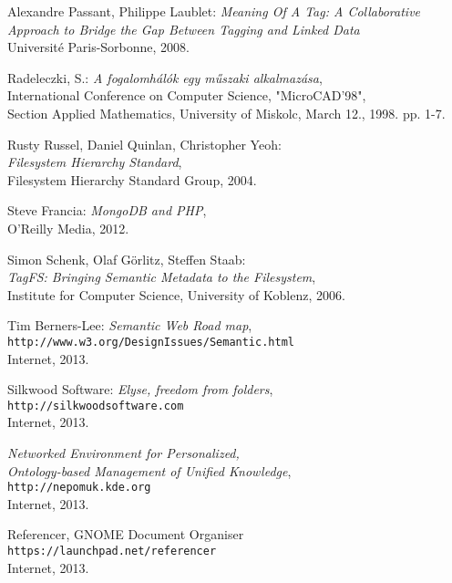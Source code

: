 \begin{thebibliography}{9}
Alexandre Passant, Philippe Laublet: \emph{Meaning Of A Tag: A Collaborative Approach to Bridge the Gap Between Tagging and Linked Data} \\
Université Paris-Sorbonne, 2008.

Radeleczki, S.: \emph{A fogalomhálók egy műszaki alkalmazása}, \\
International Conference on Computer Science, "MicroCAD'98", \\
Section Applied Mathematics, University of Miskolc, March 12., 1998. pp. 1-7.

Rusty Russel, Daniel Quinlan, Christopher Yeoh: \\
\emph{Filesystem Hierarchy Standard}, \\
Filesystem Hierarchy Standard Group, 2004.

Steve Francia: \emph{MongoDB and PHP}, \\
O'Reilly Media, 2012.

Simon Schenk, Olaf Görlitz, Steffen Staab: \\
\emph{TagFS: Bringing Semantic Metadata to the Filesystem}, \\
Institute for Computer Science, University of Koblenz, 2006.

\newpage


\bigskip

Tim Berners-Lee: \textit{Semantic Web Road map}, \\
\texttt{http://www.w3.org/DesignIssues/Semantic.html} \\
Internet, 2013.

Silkwood Software: \emph{Elyse, freedom from folders}, \\
\texttt{http://silkwoodsoftware.com} \\
Internet, 2013.

\emph{Networked Environment for Personalized, \\
Ontology-based Management of Unified Knowledge}, \\
\texttt{http://nepomuk.kde.org} \\
Internet, 2013.

Referencer, GNOME Document Organiser \\
\texttt{https://launchpad.net/referencer} \\
Internet, 2013.


\end{thebibliography}
